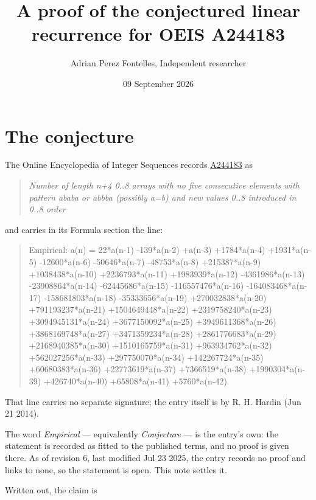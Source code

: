 \documentclass[11pt]{article}
\title{A proof of the conjectured linear recurrence for OEIS A244183}
\author{Adrian Perez Fontelles, Independent researcher}
\date{09 September 2026}
\theoremstyle{definition}
\begin{document}
\maketitle
\section{The conjecture}

The Online Encyclopedia of Integer Sequences records \href{https://oeis.org/A244183}{A244183} as

\begin{quote}\itshape Number of length n+4 0..8 arrays with no five consecutive elements with pattern ababa or abbba (possibly a=b) and new values 0..8 introduced in 0..8 order\end{quote}

and carries in its Formula section the line:

\begin{quote}\ttfamily Empirical: a(n) = 22*a(n-1) -139*a(n-2) +a(n-3) +1784*a(n-4) +1931*a(n-5) -12600*a(n-6) -50646*a(n-7) -48753*a(n-8) +215387*a(n-9) +1038438*a(n-10) +2236793*a(n-11) +1983939*a(n-12) -4361986*a(n-13) -23908864*a(n-14) -62445686*a(n-15) -116557476*a(n-16) -164083468*a(n-17) -158681803*a(n-18) -35333656*a(n-19) +270032838*a(n-20) +791193237*a(n-21) +1504649448*a(n-22) +2319758240*a(n-23) +3094945131*a(n-24) +3677150092*a(n-25) +3949611368*a(n-26) +3868169748*a(n-27) +3471359234*a(n-28) +2861776683*a(n-29) +2168940385*a(n-30) +1510165759*a(n-31) +963934762*a(n-32) +562027256*a(n-33) +297750070*a(n-34) +142267724*a(n-35) +60680383*a(n-36) +22773619*a(n-37) +7366519*a(n-38) +1990304*a(n-39) +426740*a(n-40) +65808*a(n-41) +5760*a(n-42)\end{quote}

That line carries no separate signature; the entry itself is by R. H. Hardin (Jun 21 2014).

The word {\itshape Empirical} --- equivalently {\itshape Conjecture} --- is the entry's own: the statement is recorded as fitted to the published terms, and no proof is given there. As of revision 6, last modified Jul 23 2025, the entry records no proof and links to none, so the statement is open. This note settles it.

Written out, the claim is
\end{document}

